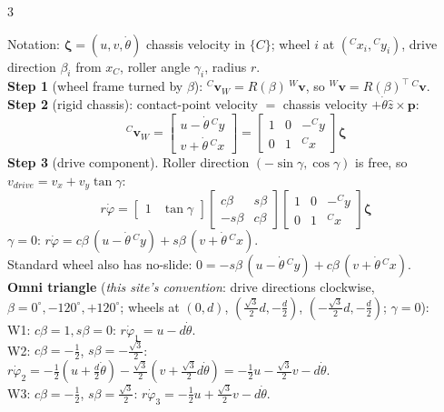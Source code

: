 \begin{multicols}{3}
\begin{fbx}
Notation: $\boldsymbol\zeta=(u,v,\dot\theta)$ chassis velocity in $\{C\}$; wheel $i$ at $({}^Cx_i,{}^Cy_i)$, drive direction $\beta_i$ from $x_C$, roller angle $\gamma_i$, radius $r$.\\
\textbf{Step 1} (wheel frame turned by $\beta$): ${}^C\mathbf v_{W}=R(\beta)\,{}^W\mathbf v$, so ${}^W\mathbf v=R(\beta)^\top\,{}^C\mathbf v$.\\
\textbf{Step 2} (rigid chassis): contact-point velocity $=$ chassis velocity $+\dot\theta\hat z\times\mathbf p$:
\[{}^C\mathbf v_W=\begin{bmatrix}u-\dot\theta\,{}^Cy\\v+\dot\theta\,{}^Cx\end{bmatrix}=\begin{bmatrix}1&0&-{}^Cy\\0&1&{}^Cx\end{bmatrix}\boldsymbol\zeta\]
\textbf{Step 3} (drive component). Roller direction $(-\sin\gamma,\cos\gamma)$ is free, so $v_{drive}=v_x+v_y\tan\gamma$:
\[r\dot\varphi=\begin{bmatrix}1&\tan\gamma\end{bmatrix}\begin{bmatrix}c\beta&s\beta\\-s\beta&c\beta\end{bmatrix}\begin{bmatrix}1&0&-{}^Cy\\0&1&{}^Cx\end{bmatrix}\boldsymbol\zeta\]
$\gamma=0$: $r\dot\varphi=c\beta\,(u-\dot\theta\,{}^Cy)+s\beta\,(v+\dot\theta\,{}^Cx)$.\\
Standard wheel also has no-slide: $0=-s\beta\,(u-\dot\theta\,{}^Cy)+c\beta\,(v+\dot\theta\,{}^Cx)$.\\
\textbf{Omni triangle} (\emph{this site's convention}: drive directions clockwise, $\beta=0^\circ,-120^\circ,+120^\circ$; wheels at $(0,d)$, $(\tfrac{\sqrt3}2d,-\tfrac d2)$, $(-\tfrac{\sqrt3}2d,-\tfrac d2)$; $\gamma=0$):\\
W1: $c\beta=1,s\beta=0$: $r\dot\varphi_1=u-d\dot\theta$.\\
W2: $c\beta=-\tfrac12$, $s\beta=-\tfrac{\sqrt3}2$: $r\dot\varphi_2=-\tfrac12(u+\tfrac d2\dot\theta)-\tfrac{\sqrt3}2(v+\tfrac{\sqrt3}2d\dot\theta)=-\tfrac12u-\tfrac{\sqrt3}2v-d\dot\theta$.\\
W3: $c\beta=-\tfrac12$, $s\beta=\tfrac{\sqrt3}2$: $r\dot\varphi_3=-\tfrac12u+\tfrac{\sqrt3}2v-d\dot\theta$.

\end{fbx}
\end{multicols}
